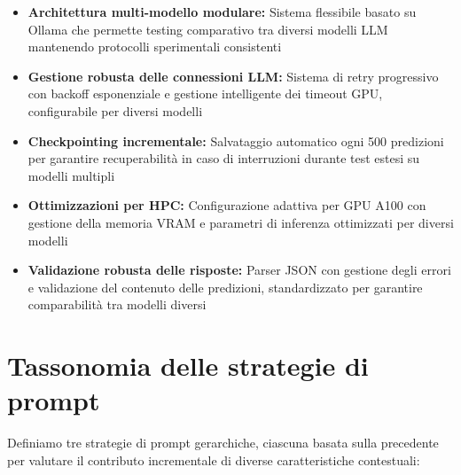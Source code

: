 \begin{itemize}
\item \textbf{Architettura multi-modello modulare:} Sistema flessibile basato su Ollama che permette testing comparativo tra diversi modelli LLM mantenendo protocolli sperimentali consistenti
\item \textbf{Gestione robusta delle connessioni LLM:} Sistema di retry progressivo con backoff esponenziale e gestione intelligente dei timeout GPU, configurabile per diversi modelli
\item \textbf{Checkpointing incrementale:} Salvataggio automatico ogni 500 predizioni per garantire recuperabilità in caso di interruzioni durante test estesi su modelli multipli
\item \textbf{Ottimizzazioni per HPC:} Configurazione adattiva per GPU A100 con gestione della memoria VRAM e parametri di inferenza ottimizzati per diversi modelli
\item \textbf{Validazione robusta delle risposte:} Parser JSON con gestione degli errori e validazione del contenuto delle predizioni, standardizzato per garantire comparabilità tra modelli diversi
\end{itemize}

\section{Tassonomia delle strategie di prompt}

Definiamo tre strategie di prompt gerarchiche, ciascuna basata sulla precedente per valutare il contributo incrementale di diverse caratteristiche contestuali:

